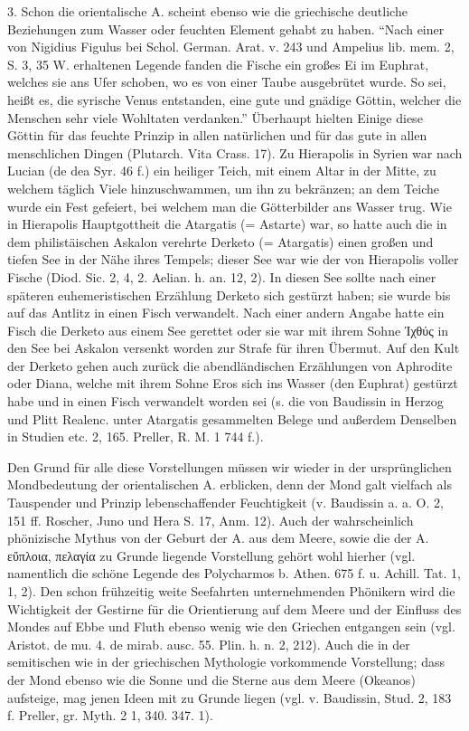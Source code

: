 \documentclass[a4paper, 11pt, oneside]{article}
\begin{document}
3. Schon die orientalische A. scheint ebenso wie die griechische deutliche Beziehungen zum Wasser oder feuchten Element gehabt zu haben. "`Nach einer von Nigidius Figulus bei Schol. German. Arat. v. 243 und Ampelius lib. mem. 2, S. 3, 35 W. erhaltenen Legende fanden die Fische ein großes Ei im Euphrat, welches sie ans Ufer schoben, wo es von einer Taube ausgebrütet wurde. So sei, heißt es, die syrische Venus entstanden, eine gute und gnädige Göttin, welcher die Menschen sehr viele Wohltaten verdanken."' Überhaupt hielten Einige diese Göttin für das feuchte Prinzip in allen natürlichen und für das gute in allen menschlichen Dingen (Plutarch. Vita Crass. 17). Zu Hierapolis in Syrien war nach Lucian (de dea Syr. 46 f.) ein heiliger Teich, mit einem Altar in der Mitte, zu welchem täglich Viele hinzuschwammen, um ihn zu bekränzen; an dem Teiche wurde ein Fest gefeiert, bei welchem man die Götterbilder ans Wasser trug. Wie in Hierapolis Hauptgottheit die Atargatis (= Astarte) war, so hatte auch die in dem philistäischen Askalon verehrte Derketo (= Atargatis) einen großen und tiefen See in der Nähe ihres Tempels; dieser See war wie der von Hierapolis voller Fische (Diod. Sic. 2, 4, 2. Aelian. h. an. 12, 2). In diesen See sollte nach einer späteren euhemeristischen Erzählung Derketo sich gestürzt haben; sie wurde bis auf das Antlitz in einen Fisch verwandelt. Nach einer andern Angabe hatte ein Fisch die Derketo aus einem See gerettet oder sie war mit ihrem Sohne Ἰχθύς in den See bei Askalon versenkt worden zur Strafe für ihren Übermut. Auf den Kult der Derketo gehen auch zurück die abendländischen Erzählungen von Aphrodite oder Diana, welche mit ihrem Sohne Eros sich ins Wasser (den Euphrat) gestürzt habe und in einen Fisch verwandelt worden sei (s. die von Baudissin in Herzog und Plitt Realenc. unter Atargatis gesammelten Belege und außerdem Denselben in Studien etc. 2, 165. Preller, R. M. 1 744 f.).

Den Grund für alle diese Vorstellungen müssen wir wieder in der ursprünglichen Mondbedeutung der orientalischen A. erblicken, denn der Mond galt vielfach als Tauspender und Prinzip lebenschaffender Feuchtigkeit (v. Baudissin a. a. O. 2, 151 ff. Roscher, Juno und Hera S. 17, Anm. 12). Auch der wahrscheinlich phönizische Mythus von der Geburt der A. aus dem Meere, sowie die der A. εὔπλοια, πελαγία zu Grunde liegende Vorstellung gehört wohl hierher (vgl. namentlich die schöne Legende des Polycharmos b. Athen. 675 f. u. Achill. Tat. 1, 1, 2). Den schon frühzeitig weite Seefahrten unternehmenden Phönikern wird die Wichtigkeit der Gestirne für die Orientierung auf dem Meere und der Einfluss des Mondes auf Ebbe und Fluth ebenso wenig wie den Griechen entgangen sein (vgl. Aristot. de mu. 4. de mirab. ausc. 55. Plin. h. n. 2, 212). Auch die in der semitischen wie in der griechischen Mythologie vorkommende Vorstellung; dass der Mond ebenso wie die Sonne und die Sterne aus dem Meere (Okeanos) aufsteige, mag jenen Ideen mit zu Grunde liegen (vgl. v. Baudissin, Stud. 2, 183 f. Preller, gr. Myth. 2 1, 340. 347. 1).
\end{document}
